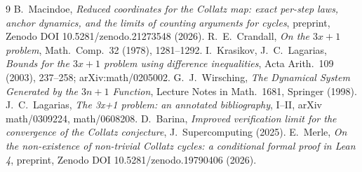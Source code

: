 \documentclass[11pt]{article}
\theoremstyle{remark}
\begin{document}
\begin{thebibliography}{9}
 B.~Macindoe, \emph{Reduced coordinates for the Collatz map: exact per-step laws, anchor dynamics, and the limits of counting arguments for cycles}, preprint, Zenodo DOI 10.5281/zenodo.21273548 (2026).
 R.~E.~Crandall, \emph{On the $3x+1$ problem}, Math.\ Comp.\ 32 (1978), 1281--1292.
 I.~Krasikov, J.~C.~Lagarias, \emph{Bounds for the $3x+1$ problem using difference inequalities}, Acta Arith.\ 109 (2003), 237--258; arXiv:math/0205002.
 G.~J.~Wirsching, \emph{The Dynamical System Generated by the $3n+1$ Function}, Lecture Notes in Math.\ 1681, Springer (1998).
 J.~C.~Lagarias, \emph{The 3x+1 problem: an annotated bibliography}, I--II, arXiv math/0309224, math/0608208.
 D.~Barina, \emph{Improved verification limit for the convergence of the Collatz conjecture}, J.\ Supercomputing (2025).
 E.~Merle, \emph{On the non-existence of non-trivial Collatz cycles: a conditional formal proof in Lean 4}, preprint, Zenodo DOI 10.5281/zenodo.19790406 (2026).
\end{thebibliography}
\end{document}
